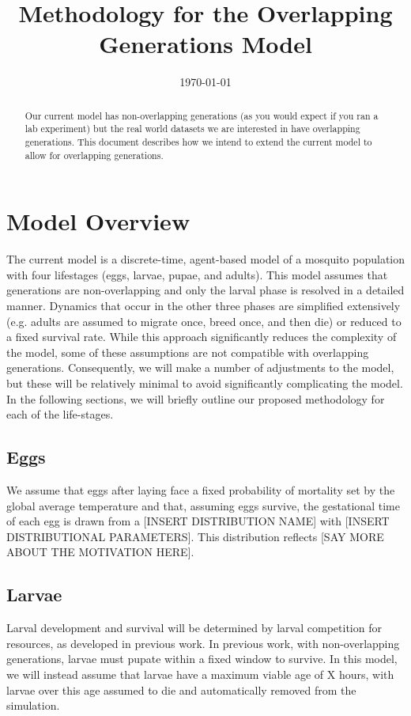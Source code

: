 \documentclass{article}
\title{Methodology for the Overlapping Generations Model}
\date{\today}
\begin{document}
\maketitle

\begin{abstract}
Our current model has non-overlapping generations (as you would expect if you ran a lab experiment) but the real world datasets we are interested in have overlapping generations. This document describes how we intend to extend the current model to allow for overlapping generations.
\end{abstract}

\section{Model Overview}
The current model is a discrete-time, agent-based model of a mosquito population with four lifestages (eggs, larvae, pupae, and adults). This model assumes that generations are non-overlapping and only the larval phase is resolved in a detailed manner. Dynamics that occur in the other three phases are simplified extensively (e.g.\! adults are assumed to migrate once, breed once, and then die) or reduced to a fixed survival rate. While this approach significantly reduces the complexity of the model, some of these assumptions are not compatible with overlapping generations. Consequently, we will make a number of adjustments to the model, but these will be relatively minimal to avoid significantly complicating the model. In the following sections, we will briefly outline our proposed methodology for each of the life-stages.

\subsection{Eggs}
We assume that eggs after laying face a fixed probability of mortality set by the global average temperature and that, assuming eggs survive, the gestational time of each egg is drawn from a [INSERT DISTRIBUTION NAME] with [INSERT DISTRIBUTIONAL PARAMETERS]. This distribution reflects [SAY MORE ABOUT THE MOTIVATION HERE].

\subsection{Larvae}
Larval development and survival will be determined by larval competition for resources, as developed in previous work. In previous work, with non-overlapping generations, larvae must pupate within a fixed window to survive. In this model, we will instead assume that larvae have a maximum viable age of X hours, with larvae over this age assumed to die and automatically removed from the simulation. 
\end{document}
